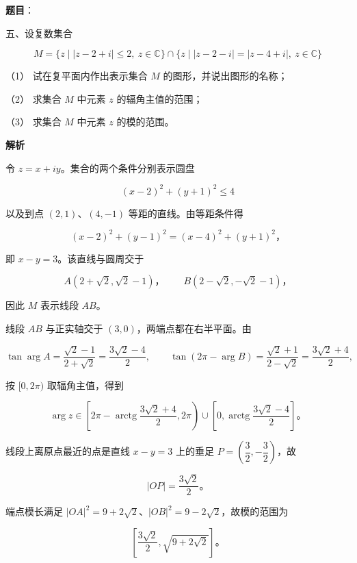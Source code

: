 \begin{answer}

\textbf{题目}：

五、设复数集合

\nopagebreak[4]
\[
M=\{z\mid |z-2+i|\le2,\ z\in\mathbb C\}\cap\{z\mid |z-2-i|=|z-4+i|,\ z\in\mathbb C\}
\]

（1） 试在复平面内作出表示集合 $M$ 的图形，并说出图形的名称；

（2） 求集合 $M$ 中元素 $z$ 的辐角主值的范围；

（3） 求集合 $M$ 中元素 $z$ 的模的范围。

\textbf{解析}


令 $z=x+iy$。集合的两个条件分别表示圆盘

\nopagebreak[4]
\[
(x-2)^2+(y+1)^2\le4
\]

以及到点 $(2,1)$、$(4,-1)$ 等距的直线。由等距条件得

\nopagebreak[4]
\[
(x-2)^2+(y-1)^2=(x-4)^2+(y+1)^2\text{，}
\]

即 $x-y=3$。该直线与圆周交于

\nopagebreak[4]
\[
A(2+\sqrt2,\sqrt2-1)\text{，}\qquad B(2-\sqrt2,-\sqrt2-1)\text{，}
\]

因此 $M$ 表示线段 $AB$。
\nopagebreak[4]
\begin{center}\end{center}
\nopagebreak[4]

线段 $AB$ 与正实轴交于 $(3,0)$，两端点都在右半平面。由

\nopagebreak[4]
\[
\tan\arg A=\frac{\sqrt2-1}{2+\sqrt2}=\frac{3\sqrt2-4}{2},\qquad
\tan(2\pi-\arg B)=\frac{\sqrt2+1}{2-\sqrt2}=\frac{3\sqrt2+4}{2},
\]

按 $[0,2\pi)$ 取辐角主值，得到

\nopagebreak[4]
\[
\arg z\in\left[2\pi-\operatorname{arctg}\frac{3\sqrt2+4}{2},2\pi\right)
\cup\left[0,\operatorname{arctg}\frac{3\sqrt2-4}{2}\right]\text{。}
\]


线段上离原点最近的点是直线 $x-y=3$ 上的垂足 $P=(\dfrac32,-\dfrac32)$，故

\nopagebreak[4]
\[
|OP|=\frac{3\sqrt2}{2}\text{。}
\]

端点模长满足 $|OA|^2=9+2\sqrt2$、$|OB|^2=9-2\sqrt2$，故模的范围为

\nopagebreak[4]
\[
\left[\frac{3\sqrt2}{2},\sqrt{9+2\sqrt2}\right]\text{。}
\]


\gkanswer{答案（2）：$[2\pi-\operatorname{arctg}\dfrac{3\sqrt2+4}{2},2\pi)\cup[0,\operatorname{arctg}\dfrac{3\sqrt2-4}{2}]$}


\end{answer}
